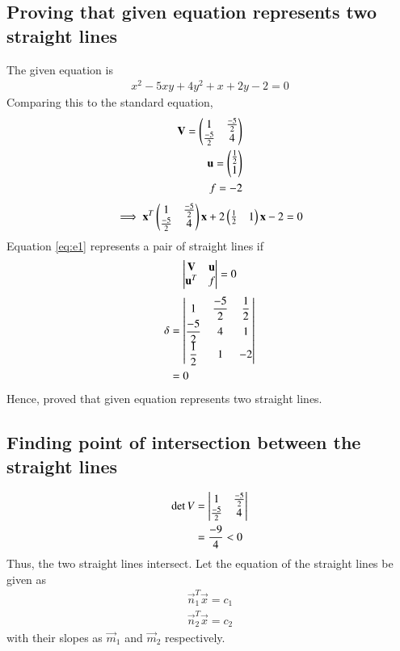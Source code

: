 \documentclass[journal,12pt,twocolumn]{IEEEtran}
\begin{document}
\subsection{Proving that given equation represents two straight lines}
The given equation is
\begin{align}\label{eq:e1}
    x^2-5xy+4y^2+x+2y-2=0
\end{align}
Comparing this to the standard equation,
\begin{align}
    \mathbf{V} = \begin{pmatrix}1 & \frac{-5}{2} \\ \frac{-5}{2} & 4\end{pmatrix}\\
    \mathbf{u} = \begin{pmatrix}\frac{1}{2} \\ 1\end{pmatrix}\\
    f = -2
\end{align}
\begin{align}\label{eq:e3}
    \implies\mathbf{x}^T\begin{pmatrix}1 & \frac{-5}{2} \\ \frac{-5}{2} & 4\end{pmatrix}\mathbf{x} + 2\begin{pmatrix}\frac{1}{2} & 1\end{pmatrix}\mathbf{x} -2 = 0
\end{align}
Equation \eqref{eq:e1} represents a pair of straight lines if
\begin{align}
    \label{eq:det}\begin{vmatrix}\mathbf{V} & \mathbf{u}\\ \mathbf{u}^T & f\end{vmatrix}=0
\end{align}
\begin{align}
    \delta & = \begin{vmatrix}1 & \dfrac{-5}{2} & \dfrac{1}{2} \\ \dfrac{-5}{2} & 4 & 1 \\ \dfrac{1}{2} & 1 & -2\end{vmatrix} \\ & = 0
\end{align}
Hence, proved that given equation represents two straight lines.
\subsection{Finding point of intersection between the straight lines}
\begin{align}
    \det V & = \begin{vmatrix}1 & \frac{-5}{2}\\ \frac{-5}{2} & 4\end{vmatrix}\\ & = \frac{-9}{4} < 0
\end{align}
Thus, the two straight lines intersect. Let the equation of the straight lines be given as
\begin{align}
    \label{eq:line1}\vec{n}_1^T\vec{x}=c_1 \\
    \label{eq:line2}\vec{n}_2^T\vec{x}=c_2
\end{align}
with their slopes as $\vec{m}_1$ and $\vec{m}_2$ respectively.
\end{document}
